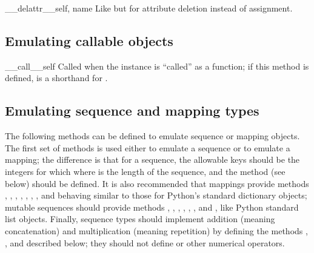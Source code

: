 \begin{methoddescni}{__delattr__}{self, name}
Like  but for attribute deletion instead of
assignment.
\end{methoddescni}


\subsection{Emulating callable objects\label{callable-types}}

\begin{methoddescni}{__call__}{self}
Called when the instance is ``called'' as a function; if this method
is defined,  is a shorthand for
.
\end{methoddescni}


\subsection{Emulating sequence and mapping types\label{sequence-types}}

The following methods can be defined to emulate sequence or mapping
objects.  The first set of methods is used either to emulate a
sequence or to emulate a mapping; the difference is that for a
sequence, the allowable keys should be the integers  for which
 where  is the length of the
sequence, and the method  (see below) should be
defined.  It is also recommended that mappings provide methods
, , ,
, , , ,
and  behaving similar to those for
Python's standard dictionary objects; mutable sequences should provide
methods , , ,
, , , 
and , like Python standard list objects.  Finally,
sequence types should implement addition (meaning concatenation) and
multiplication (meaning repetition) by defining the methods
, ,  and
 described below; they should not define
 or other numerical operators.

